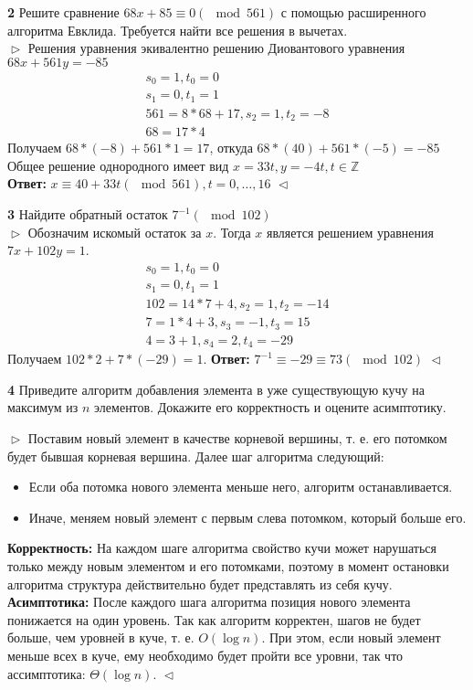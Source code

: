 \documentclass{article}
\begin{document}
\textbf{2} Решите сравнение $68x + 85 \equiv 0 (\mod 561)$ с помощью расширенного алгоритма Евклида. Требуется найти все решения в вычетах.\\
$\vartriangleright$
Решения уравнения экивалентно решению Диовантового уравнения $68x + 561y = -85$\\
\begin{gather*}
  s_{0} = 1, t_{0} = 0\\
  s_{1} = 0, t_{1} = 1\\
  561 = 8*68 + 17, s_{2} = 1, t_{2} = -8\\
  68 = 17*4
\end{gather*}
Получаем $68*(-8) + 561*1 = 17$, откуда $68*(40) + 561*(-5) = -85$\\
Общее решение однородного имеет вид $x = 33t, y = -4t, t\in \mathbb{Z}$\\
\textbf{Ответ:} $x \equiv 40 + 33t (\mod 561), t = 0, \ldots, 16$
$\vartriangleleft$
\medskip

\textbf{3} Найдите обратный остаток $7^{-1} (\mod 102)$\\
$\vartriangleright$
Обозначим искомый остаток за $x$. Тогда $x$ является решением уравнения $7x + 102y = 1$.\\
\begin{gather*}
  s_{0} = 1, t_{0} = 0\\
  s_{1} = 0, t_{1} = 1\\
  102 = 14*7 + 4, s_{2} = 1, t_{2} = -14\\
  7 = 1*4 + 3, s_{3} = -1, t_{3} = 15\\
  4 = 3+1, s_{4} = 2, t_{4} = -29
\end{gather*}
Получаем $102*2 + 7*(-29) = 1$.
\textbf{Ответ:} $7^{-1}\equiv -29 \equiv 73(\mod 102)$
$\vartriangleleft$
\medskip

\textbf{4} Приведите алгоритм добавления элемента в уже существующую кучу на максимум из $n$ элементов. Докажите его корректность и оцените асимптотику.

$\vartriangleright$
Поставим новый элемент в качестве корневой вершины, т. е. его потомком будет бывшая корневая
вершина. Далее шаг алгоритма следующий:
\begin{itemize}
  \item Если оба потомка нового элемента меньше него, алгоритм останавливается.
  \item Иначе, меняем новый элемент с первым слева потомком, который больше его.
\end{itemize}
\textbf{Корректность:} На каждом шаге алгоритма свойство кучи может нарушаться только между
новым элементом и его потомками, поэтому в момент остановки алгоритма
структура действительно будет представлять из себя кучу.\\
\textbf{Асимптотика:} После каждого шага алгоритма позиция нового элемента понижается на
один уровень. Так как алгоритм корректен, шагов не будет больше, чем уровней в куче, т. е. $O(\log n)$.
При этом, если новый элемент меньше всех в куче, ему необходимо будет пройти все уровни, так что
ассимптотика: $\Theta(\log n)$.
$\vartriangleleft$
\medskip
\end{document}
